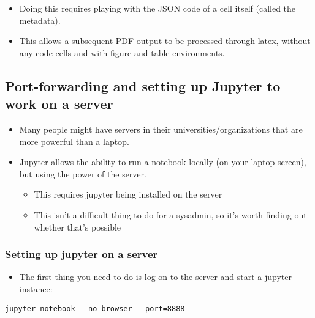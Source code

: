 \documentclass[10pt,parskip=half,
	toc=sectionentrywithdots,
	bibliography=totocnumbered,
	captions=tableheading,numbers=noendperiod]{scrartcl}
\providecommand{\tightlist}{%
  \setlength{\itemsep}{0pt}\setlength{\parskip}{0pt}}
\begin{document}
\begin{itemize}
\tightlist
\item
  Doing this requires playing with the JSON code of a cell itself
  (called the metadata).
\item
  This allows a subsequent PDF output to be processed through latex,
  without any code cells and with figure and table environments.
\end{itemize}

\hypertarget{port-forwarding-and-setting-up-jupyter-to-work-on-a-server}{%
\subsection{Port-forwarding and setting up Jupyter to work on a
server}\label{port-forwarding-and-setting-up-jupyter-to-work-on-a-server}}

\begin{itemize}
\tightlist
\item
  Many people might have servers in their universities/organizations
  that are more powerful than a laptop.
\item
  Jupyter allows the ability to run a notebook locally (on your laptop
  screen), but using the power of the server.

  \begin{itemize}
  \tightlist
  \item
    This requires jupyter being installed on the server
  \item
    This isn't a difficult thing to do for a sysadmin, so it's worth
    finding out whether that's possible
  \end{itemize}
\end{itemize}

\hypertarget{setting-up-jupyter-on-a-server}{%
\subsubsection{Setting up jupyter on a
server}\label{setting-up-jupyter-on-a-server}}

\begin{itemize}
\tightlist
\item
  The first thing you need to do is log on to the server and start a
  jupyter instance:
\end{itemize}

\texttt{jupyter\ notebook\ -\/-no-browser\ -\/-port=8888}
\end{document}
